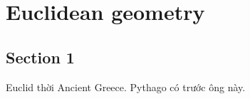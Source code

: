 \chapter{Euclidean geometry}

\section{Section 1}

Euclid thời Ancient Greece. Pythago có trước ông này.